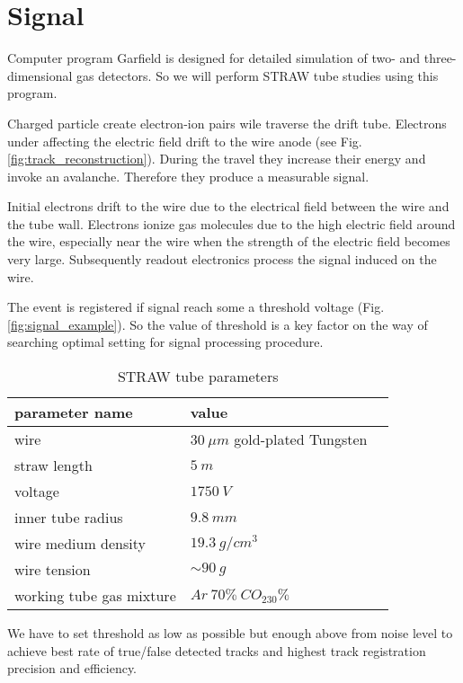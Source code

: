 \section{Signal}
	Computer program Garfield \cite{garfield} is designed for detailed simulation of two- and three-dimensional gas detectors. So we will perform STRAW tube studies using this program.
	
	Charged particle  create electron-ion pairs wile traverse the drift tube. Electrons under affecting the electric field drift to the wire anode (see Fig.\ref{fig:track_reconstruction}). During the travel they increase their energy and invoke an avalanche. Therefore they produce a measurable signal.

	Initial electrons drift to the wire due to the electrical field between the wire and the tube wall. Electrons ionize gas molecules due to the high electric field around the wire, especially near the wire when the strength of the electric field becomes very large.  Subsequently readout electronics process the signal induced on the wire.
	  
	The event is registered if signal reach some a threshold voltage (Fig. \ref{fig:signal_example}). So the value of threshold is a key factor on the way of searching optimal setting for signal processing procedure.
	
	\begin{table}[h]
	\centering
	\caption[Table caption text]{STRAW tube parameters }
	\begin{tabular}{|l|l|p{8cm}|}
		\hline
		parameter name & value \\
		\hline
		wire & $30~\mu m$ gold-plated Tungsten\\
		\hline
		straw length & $5~m$ \\
		\hline
		voltage & $1750~V$ \\
		\hline
		inner tube radius & $9.8~mm$ \\
		\hline
		wire medium density & $19.3 ~g/cm^3$ \\
		\hline
		wire tension& $\sim 90~g$ \\
		\hline
		working tube gas mixture & $Ar~70\% ~CO_230\%$ \\
		\hline
	\end{tabular}
	
	\label{table:straw_par}
	\end{table}		
	
	We have to set threshold as low as possible but enough above from noise level to achieve best rate of true/false detected tracks and highest track registration precision and efficiency.
	
